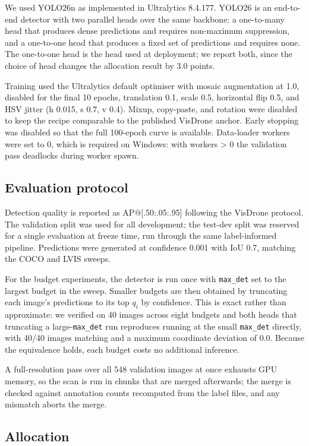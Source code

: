 \documentclass[sn-mathphys,Numbered]{sn-jnl}
\begin{document}
We used YOLO26n as implemented in Ultralytics 8.4.177. YOLO26 is an end-to-end detector with two parallel heads over the same backbone: a one-to-many head that produces dense predictions and requires non-maximum suppression, and a one-to-one head that produces a fixed set of predictions and requires none. The one-to-one head is the head used at deployment; we report both, since the choice of head changes the allocation result by 3.0 points.

Training used the Ultralytics default optimiser with mosaic augmentation at 1.0, disabled for the final 10 epochs, translation 0.1, scale 0.5, horizontal flip 0.5, and HSV jitter (h 0.015, s 0.7, v 0.4). Mixup, copy-paste, and rotation were disabled to keep the recipe comparable to the published VisDrone anchor. Early stopping was disabled so that the full 100-epoch curve is available. Data-loader workers were set to 0, which is required on Windows: with workers > 0 the validation pass deadlocks during worker spawn.

\subsection{Evaluation protocol}

Detection quality is reported as AP@[.50:.05:.95] following the VisDrone protocol. The validation split was used for all development; the test-dev split was reserved for a single evaluation at freeze time, run through the same label-informed pipeline. Predictions were generated at confidence 0.001 with IoU 0.7, matching the COCO and LVIS sweeps.

For the budget experiments, the detector is run once with \texttt{max\_det} set to the largest budget in the sweep. Smaller budgets are then obtained by truncating each image's predictions to its top $q_i$ by confidence. This is exact rather than approximate: we verified on 40 images across eight budgets and both heads that truncating a large-\texttt{max\_det} run reproduces running at the small \texttt{max\_det} directly, with 40/40 images matching and a maximum coordinate deviation of 0.0. Because the equivalence holds, each budget costs no additional inference.

A full-resolution pass over all 548 validation images at once exhausts GPU memory, so the scan is run in chunks that are merged afterwards; the merge is checked against annotation counts recomputed from the label files, and any mismatch aborts the merge.

\subsection{Allocation}
\end{document}
